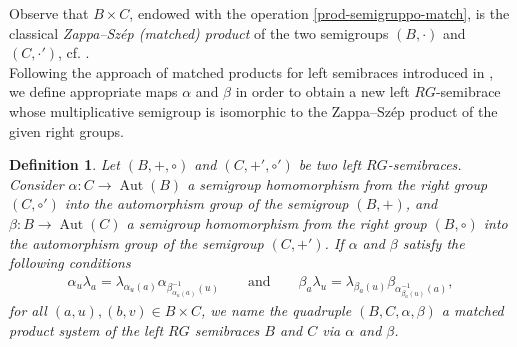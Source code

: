 \documentclass[11pt]{amsart}
\newcommand{\Aut}{\operatorname{Aut}}
\newtheorem{definition}[theorem]{Definition}
\theoremstyle{definition}
\begin{document}
\smallskip

Observe that $B \times C$, endowed with the operation \eqref{prod-semigruppo-match}, is the classical \emph{Zappa--Szép (matched) product} of the two semigroups $(B, \cdot)$ and $(C, \cdot')$, cf. \cite{Ku83}. \\
Following the approach of matched products for left semibraces introduced in \cite{CCSt20-1}, we define appropriate maps $\alpha$ and $\beta$ in order to obtain a new left $RG$-semibrace whose multiplicative semigroup is isomorphic to the Zappa–Szép product of the given right groups.
   
    \smallskip



\begin{definition}
    {\rm Let $(B, +, \circ)$ and $(C, +', \circ')$ be two left $RG$-semibraces. Consider $\alpha:C\to\Aut(B)$ a semigroup homomorphism from the right group $(C,\circ')$ into the automorphism group of the semigroup $(B,+)$, and $\beta:B\to\Aut(C)$ a semigroup homomorphism from the right group $(B,\circ)$ into the automorphism group of the semigroup $(C,+')$. If $\alpha$ and $\beta$ satisfy the following conditions
    \begin{align}\label{eq:lambda-alpha}
    \alpha_u\lambda_a = \lambda_{\alpha_u(a)}\alpha_{\beta^{-1}_{\alpha_u(a)}(u)}
    \qquad\text{and}\qquad
        \beta_a\lambda_u = \lambda_{\beta_a(u)}\beta_{\alpha^{-1}_{\beta_a(u)}(a)},
    \end{align}
    for all $(a,u), (b,v)\in B\times C$, we name the quadruple $(B, C, \alpha, \beta)$ a \emph{matched product system of the left $RG$ semibraces $B$ and $C$ via $\alpha$ and $\beta$}.}
\end{definition}

\smallskip
\end{document}
